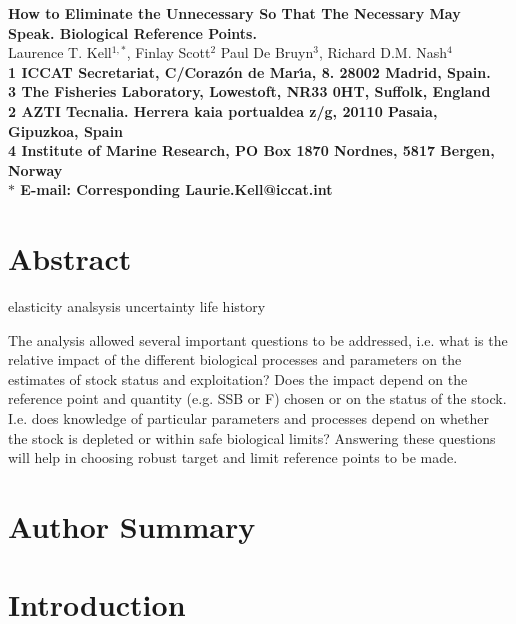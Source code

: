 \documentclass[10pt]{article}
\date{}
\begin{document}
\begin{flushleft}
{\Large
\textbf{How to Eliminate the Unnecessary So That The Necessary May Speak. Biological Reference Points.}
}
\\
Laurence T. Kell$^{1,\ast}$, 
Finlay Scott$^{2}$
Paul De Bruyn$^{3}$, 
Richard D.M. Nash$^{4}$
\\
\bf{1}  ICCAT Secretariat, C/Coraz\'{o}n de Mar\'{\i}a, 8. 28002 Madrid, Spain.
\\
\bf{3}  The Fisheries Laboratory, Lowestoft, NR33 0HT, Suffolk, England
\\
\bf{2}  AZTI Tecnalia. Herrera kaia portualdea z/g, 20110 Pasaia, Gipuzkoa, Spain
\\
\bf{4}  Institute of Marine Research, PO Box 1870 Nordnes, 5817 Bergen, Norway
\\
$\ast$ E-mail: Corresponding Laurie.Kell@iccat.int
\end{flushleft}

\section*{Abstract}

elasticity analsysis
uncertainty
life history

The analysis allowed several important questions to be addressed, i.e. what is the relative impact of the different biological processes and parameters 
on the estimates of stock status and exploitation? Does the impact depend on the reference point and quantity (e.g. SSB or F) chosen or on the status 
of the stock. I.e. does knowledge of particular parameters and processes depend on whether the stock is depleted or within safe biological limits? 
Answering these questions will help in choosing robust target and limit reference points to be made.


\section*{Author Summary}

\section*{Introduction}
\end{document}
